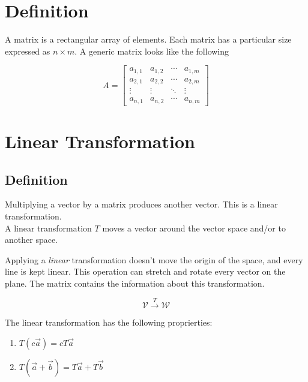 \documentclass[a4paper]{article}
\author{Paolo Bettelini}
\date{}
\begin{document}
\maketitle
\tableofcontents
\pagebreak

\section{Definition}

A matrix is a rectangular array of elements.
Each matrix has a particular size expressed as \(n \times m\).
A generic matrix looks like the following

\[
A = \begin{bmatrix} 
        a_{1,1} & a_{1,2} & \cdots & a_{1,m} \\
        a_{2,1} & a_{2,2} & \cdots & a_{2,m} \\
        \vdots  & \vdots  & \ddots & \vdots  \\
        a_{n,1} & a_{n,2} & \cdots & a_{n,m} 
    \end{bmatrix}
\]

\section{Linear Transformation}

\subsection{Definition}

Multiplying a vector by a matrix produces another vector. This is a linear transformation. \\
A linear transformation \(T\) moves a vector around the vector space and/or to another space.

Applying a \textit{linear} transformation doesn't move the origin of the space, and every line
is kept linear. This operation can stretch and rotate every vector on the plane.
The matrix contains the information about this transformation.

\[
    \mathcal{V} \xrightarrow{T} \mathcal{W}
\]

The linear transformation has the following proprierties:

\begin{enumerate}
    \item \(T(c\vec{a})=cT\vec{a}\)
    \item \(T(\vec{a} + \vec{b}) = T\vec{a} + T\vec{b}\)
\end{enumerate}
\end{document}
